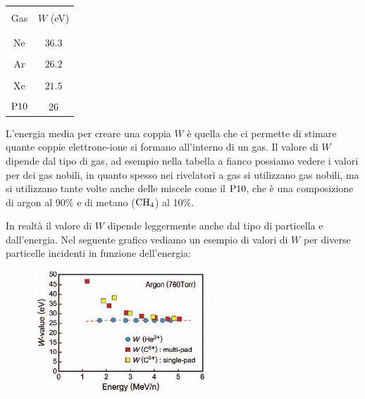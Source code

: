 \begin{minipage}{0.245\textwidth}
   \begin{center}
      \begin{tabular}{|c|c|}
         \hline
         &\\[-0.4cm]
         Gas & $W$ (eV)\\[0.1mm]
         &\\[-0.4cm]
         \hline
         &\\[-0.4cm]
         Ne & $36.3$\\[0.1mm]
         \hline
         &\\[-0.4cm]
         Ar & $26.2$\\[0.1mm]
         \hline
         &\\[-0.4cm]
         Xe & $21.5$\\[0.1mm]
         \hline
         &\\[-0.4cm]
         $\rm P10$ & $26$\\[0.1mm]
         \hline
      \end{tabular}
   \end{center}
\end{minipage}
\begin{minipage}{0.75\textwidth}
   \vspace{0.1cm}L'energia media per creare una coppia $W$ è quella che ci permette di stimare quante coppie elettrone-ione si formano all'interno di un gas. Il valore di $W$ dipende dal tipo di gas, ad esempio nella tabella a fianco possiamo vedere i valori per dei gas nobili, in quanto spesso nei rivelatori a gas si utilizzano gas nobili, ma si utilizzano tante volte anche delle miscele come il $\rm P10$, che è una composizione di argon al 90\% e di metano ($\rm CH_4$) al 10\%.
\end{minipage}

\vspace{0.4cm}

In realtà il valore di $W$ dipende leggermente anche dal tipo di particella e dall'energia. Nel seguente grafico vediamo un esempio di valori di $W$ per diverse particelle incidenti in funzione dell'energia:

\begin{figure}[H]
   \centering
   \includegraphics[width=0.6\textwidth]{immagini/vallori_W_energia.png}
\end{figure}

